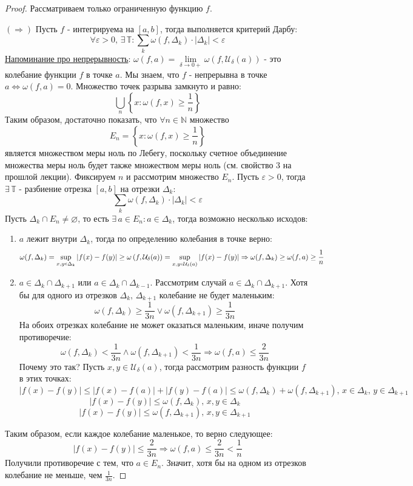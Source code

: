 \documentclass[12pt]{article}
\newcommand{\MN}{\mathbb{N}}
\newcommand{\MTB}{\mathbb{T}}
\newcommand{\MU}{\mathcal{U}}
\newcommand{\VN}{\varnothing}
\newcommand{\VE}{\varepsilon}
\theoremstyle{definition}
\newcommand{\smallerrel}[1]{\mathrel{\mathpalette\smallerrelaux{#1}}}
\newcommand{\smallerrelaux}[2]{\raisebox{.1ex}{\scalebox{.75}{$#1#2$}}}
\newcommand{\smallin}{\smallerrel{\in}}
\begin{document}
\begin{proof}
	Рассматриваем только ограниченную функцию $f$.
	
	$(\Rightarrow)$ Пусть $f$ - интегрируема на $[a,b]$, тогда выполняется критерий Дарбу:
	$$
		\forall \VE > 0, \, \exists \, \MTB \colon \sum\limits_{k}\omega(f,\Delta_k){\cdot}|\Delta_k| < \VE
	$$
	\uline{Напоминание про непрерывность}: $\omega(f,a) = \lim\limits_{\delta \to 0+} \omega\left(f, \MU_\delta(a)\right)$ - это колебание функции $f$ в точке $a$. Мы знаем, что $f$ - непрерывна в точке $a \Leftrightarrow \omega(f,a) = 0$. Множество точек разрыва замкнуто и равно:
	$$
		\bigcup\limits_{n} \left\{x \colon \omega(f,x) \geq \dfrac{1}{n}\right\}
	$$
	Таким образом, достаточно показать, что $\forall n \in \MN$ множество 
	$$
		E_n = \left\{x \colon \omega(f,x) \geq \dfrac{1}{n}\right\}
	$$
	является множеством меры ноль по Лебегу, поскольку счетное объединение множества меры ноль будет также множеством меры ноль (см. свойство $3$ на прошлой лекции). Фиксируем $n$ и рассмотрим множество $E_n$. Пусть $\VE > 0$, тогда $\exists \, \MTB$ - разбиение отрезка $[a,b]$ на отрезки $\Delta_k$:
	$$
		\sum\limits_k \omega(f,\Delta_k){\cdot}|\Delta_k| < \VE
	$$
	Пусть $\Delta_k \cap E_n \neq \VN$, то есть $\exists \, a \in E_n \colon a \in \Delta_k$, тогда возможно несколько исходов:
	\begin{enumerate}[label={(\arabic*)}]
		\item $a$ лежит внутри $\Delta_k$, тогда по определению колебания в точке верно: 
		$$
			\omega(f,\Delta_k) = \sup\limits_{x,y\smallin \Delta_k}|f(x) - f(y)| \geq \omega\left(f, \MU_\delta(a)\right) = \sup\limits_{x,y\smallin \MU_\delta(a)}|f(x) - f(y)| \Rightarrow \omega(f,\Delta_k) \geq \omega(f,a) \geq \dfrac{1}{n}
		$$
		\item $a \in \Delta_k \cap \Delta_{k+1}$ или $a \in \Delta_k \cap \Delta_{k-1}$. Рассмотрим случай $a \in \Delta_k \cap \Delta_{k+1}$. Хотя бы для одного из отрезков $\Delta_k, \, \Delta_{k+1}$ колебание не будет маленьким: 
		$$
			\omega(f,\Delta_k) \geq \dfrac{1}{3n} \vee \omega(f,\Delta_{k+1}) \geq \dfrac{1}{3n}
		$$ 
		На обоих отрезках колебание не может оказаться маленьким, иначе получим противоречие: 
		$$
			\omega(f,\Delta_k) < \dfrac{1}{3n} \wedge \omega(f,\Delta_{k+1}) < \dfrac{1}{3n} \Rightarrow \omega(f,a) \leq \dfrac{2}{3n}
		$$
		Почему это так? Пусть $x,y \in \MU_\delta(a)$, тогда рассмотрим разность функции $f$ в этих точках:
		$$
			|f(x) - f(y)| \leq |f(x) - f(a)| + |f(y) - f(a)| \leq \omega(f,\Delta_k) + \omega(f,\Delta_{k+1}), \, x \in \Delta_k, \, y \in \Delta_{k+1}
		$$
		$$
			|f(x) - f(y)| \leq \omega(f,\Delta_k), \, x,y \in \Delta_k
		$$
		$$
			|f(x) - f(y)| \leq \omega(f,\Delta_{k+1}), \, x,y \in \Delta_{k+1}
		$$
	\end{enumerate}
	Таким образом, если каждое колебание маленькое, то верно следующее:
	$$
		|f(x) - f(y)| \leq \dfrac{2}{3n} \Rightarrow \omega(f,a) \leq \dfrac{2}{3n} < \dfrac{1}{n}
	$$
	Получили противоречие с тем, что $a \in E_n$. Значит, хотя бы на одном из отрезков колебание не меньше, чем $\tfrac{1}{3n}$. 
	

\end{proof}
\end{document}
